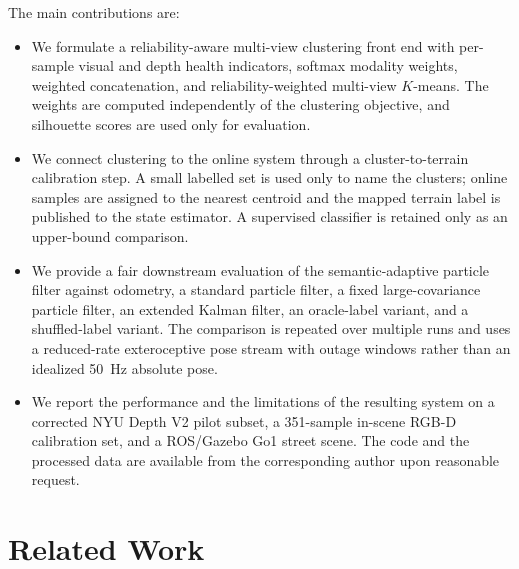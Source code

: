 \documentclass[final,3p,times]{elsarticle}
\begin{document}
The main contributions are:
\begin{itemize}
    \item We formulate a reliability-aware multi-view clustering front end with per-sample visual and depth health indicators, softmax modality weights, weighted concatenation, and reliability-weighted multi-view $K$-means. The weights are computed independently of the clustering objective, and silhouette scores are used only for evaluation.
    \item We connect clustering to the online system through a cluster-to-terrain calibration step. A small labelled set is used only to name the clusters; online samples are assigned to the nearest centroid and the mapped terrain label is published to the state estimator. A supervised classifier is retained only as an upper-bound comparison.
    \item We provide a fair downstream evaluation of the semantic-adaptive particle filter against odometry, a standard particle filter, a fixed large-covariance particle filter, an extended Kalman filter, an oracle-label variant, and a shuffled-label variant. The comparison is repeated over multiple runs and uses a reduced-rate exteroceptive pose stream with outage windows rather than an idealized 50~Hz absolute pose.
    \item We report the performance and the limitations of the resulting system on a corrected NYU Depth V2 pilot subset, a 351-sample in-scene RGB-D calibration set, and a ROS/Gazebo Go1 street scene. The code and the processed data are available from the corresponding author upon reasonable request.
\end{itemize}

\section{Related Work}
\label{sec:related_work}
\end{document}
